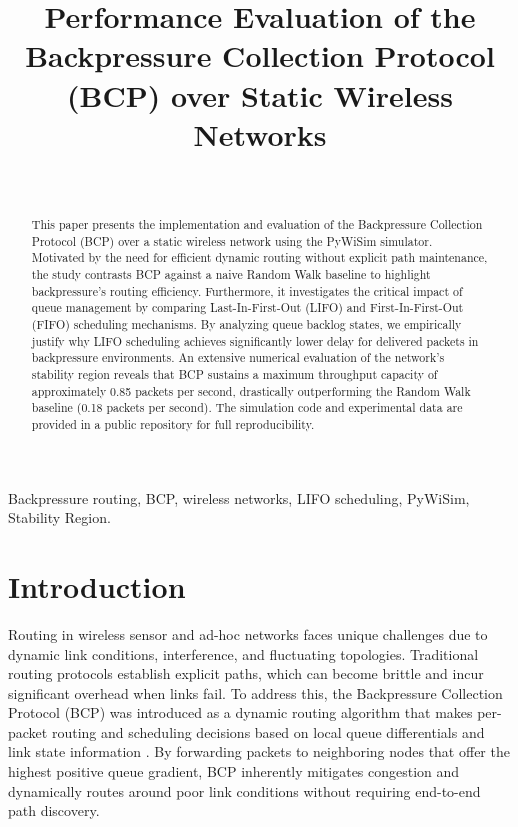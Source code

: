 \documentclass[10pt, twocolumn, letterpaper]{article}
\title{\vspace{-0.5in}\Large\textbf{Performance Evaluation of the Backpressure Collection Protocol (BCP) over Static Wireless Networks}}
\author{
\IEEEauthorblockN{Chin-Wei Huang}
\IEEEauthorblockA{Ming Hsieh Department of Electrical and Computer Engineering} 
\IEEEauthorblockA{University of Southern California}\\
\IEEEauthorblockA{Los Angeles, California}
}
\date{}
\newcommand{\IEEEkeywords}{\textbf{\textit{Index Terms---}}}
\newenvironment{IEEEkeywords_env}{\vspace{1em}\noindent\IEEEkeywords}{}
\begin{document}
\maketitle

\begin{abstract}
This paper presents the implementation and evaluation of the Backpressure Collection Protocol (BCP) over a static wireless network using the PyWiSim simulator. Motivated by the need for efficient dynamic routing without explicit path maintenance, the study contrasts BCP against a naive Random Walk baseline to highlight backpressure's routing efficiency. Furthermore, it investigates the critical impact of queue management by comparing Last-In-First-Out (LIFO) and First-In-First-Out (FIFO) scheduling mechanisms. By analyzing queue backlog states, we empirically justify why LIFO scheduling achieves significantly lower delay for delivered packets in backpressure environments. An extensive numerical evaluation of the network's stability region reveals that BCP sustains a maximum throughput capacity of approximately 0.85 packets per second, drastically outperforming the Random Walk baseline (0.18 packets per second). The simulation code and experimental data are provided in a public repository for full reproducibility.
\end{abstract}

\begin{IEEEkeywords_env}
Backpressure routing, BCP, wireless networks, LIFO scheduling, PyWiSim, Stability Region.
\end{IEEEkeywords_env}

\section{Introduction}
Routing in wireless sensor and ad-hoc networks faces unique challenges due to dynamic link conditions, interference, and fluctuating topologies. Traditional routing protocols establish explicit paths, which can become brittle and incur significant overhead when links fail. To address this, the Backpressure Collection Protocol (BCP) was introduced as a dynamic routing algorithm that makes per-packet routing and scheduling decisions based on local queue differentials and link state information \cite{b1}. By forwarding packets to neighboring nodes that offer the highest positive queue gradient, BCP inherently mitigates congestion and dynamically routes around poor link conditions without requiring end-to-end path discovery.
\end{document}
